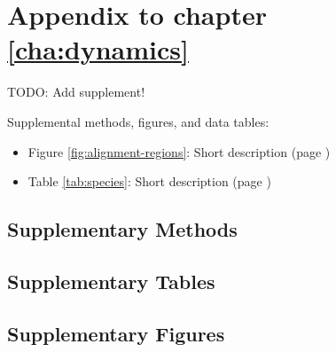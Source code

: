 \chapter{Appendix to chapter \ref{cha:dynamics}}

TODO: Add supplement!

\ifdraft{%
}%
{%
}%

Supplemental methods, figures, and data tables:

\begin{itemize}
	\item Figure \ref{fig:alignment-regions}: Short description (page \pageref{fig:alignment-regions})
\end{itemize}

\begin{itemize}
	\item Table \ref{tab:species}: Short description (page \pageref{tab:species})
\end{itemize}

\section{Supplementary Methods}

\section{Supplementary Tables}

\section{Supplementary Figures}



